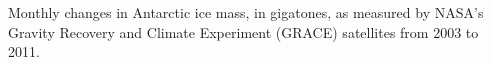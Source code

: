 \documentclass[aspectratio=169]{beamer}
\begin{document}


{
\begin{frame}[plain]
\begin{columns}[onlytextwidth]
        \begin{column}{.6\textwidth}
        \end{column}
	\begin{column}{0.4\textwidth}
		\begin{shaded}
			Monthly changes in Antarctic ice mass, in gigatones, as measured by NASA's Gravity Recovery and Climate Experiment (GRACE) satellites from 2003 to 2011.
		\end{shaded}
	\end{column}
    \end{columns}
\end{frame}}

\end{document}
